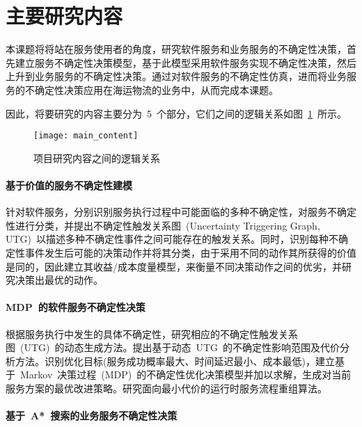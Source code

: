 \section{主要研究内容}

本课题将将站在服务使用者的角度，研究软件服务和业务服务的不确定性决策，首先建立服务不确定性决策模型，基于此模型采用软件服务实现不确定性决策，然后上升到业务服务的不确定性决策。通过对软件服务的不确定性仿真，进而将业务服务的不确定性决策应用在海运物流的业务中，从而完成本课题。

因此，将要研究的内容主要分为~5~个部分，它们之间的逻辑关系如图~\ref{main_content}~所示。

\begin{figure}[htbp]
    \centering
    \texttt{[image: main\_content]}
    \caption{项目研究内容之间的逻辑关系}\label{main_content}
    \vspace{-1em}
\end{figure}

\setcounter{paragraph}{0}

\paragraph{基于价值的服务不确定性建模}

针对软件服务，分别识别服务执行过程中可能面临的多种不确定性，对服务不确定性进行分类，并提出不确定性触发关系图~(Uncertainty Triggering Graph, UTG)~以描述多种不确定性事件之间可能存在的触发关系。同时，识别每种不确定性事件发生后可能的决策动作并将其分类，由于采用不同的动作其所获得的价值是同的，因此建立其收益/成本度量模型，来衡量不同决策动作之间的优劣，并研究决策出最优的动作。

\paragraph{MDP~的软件服务不确定性决策}

根据服务执行中发生的具体不确定性，研究相应的不确定性触发关系图~(UTG)~的动态生成方法。提出基于动态~UTG~的不确定性影响范围及代价分析方法。识别优化目标(服务成功概率最大、时间延迟最小、成本最低)，建立基于~Markov~决策过程~(MDP)~的不确定性优化决策模型并加以求解，生成对当前服务方案的最优改进策略。研究面向最小代价的运行时服务流程重组算法。

\paragraph{基于~A*~搜索的业务服务不确定性决策}

